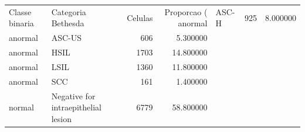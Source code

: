 \begin{tabular}{llrr}
\toprule
Classe binaria & Categoria Bethesda & Celulas & Proporcao (%
\midrule
anormal & ASC-H & 925 & 8.000000 \\
anormal & ASC-US & 606 & 5.300000 \\
anormal & HSIL & 1703 & 14.800000 \\
anormal & LSIL & 1360 & 11.800000 \\
anormal & SCC & 161 & 1.400000 \\
normal & Negative for intraepithelial lesion & 6779 & 58.800000 \\
\bottomrule
\end{tabular}
